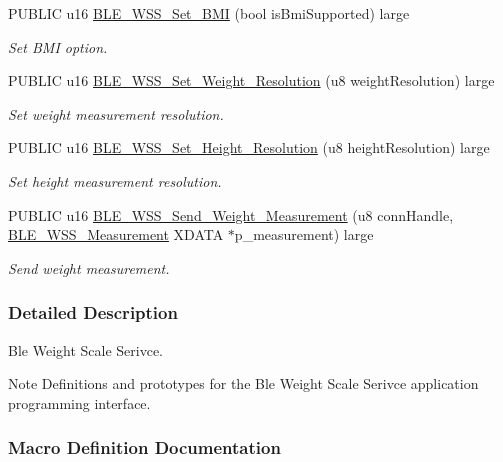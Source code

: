 \begin{DoxyCompactItemize}
P\+U\+B\+L\+IC u16 \hyperlink{group___b_l_e___w_s_s_gabc70a04b5bab2834d03c923ab7c8aaae}{B\+L\+E\+\_\+\+W\+S\+S\+\_\+\+Set\+\_\+\+B\+MI} (bool is\+Bmi\+Supported) large
\begin{DoxyCompactList}\small\item\em Set B\+MI option. \end{DoxyCompactList}\item 
P\+U\+B\+L\+IC u16 \hyperlink{group___b_l_e___w_s_s_ga89d81d43ec73d706fe9990cc163deaa2}{B\+L\+E\+\_\+\+W\+S\+S\+\_\+\+Set\+\_\+\+Weight\+\_\+\+Resolution} (u8 weight\+Resolution) large
\begin{DoxyCompactList}\small\item\em Set weight measurement resolution. \end{DoxyCompactList}\item 
P\+U\+B\+L\+IC u16 \hyperlink{group___b_l_e___w_s_s_gad5e40d9fb0c308ac600d4d169442ea0c}{B\+L\+E\+\_\+\+W\+S\+S\+\_\+\+Set\+\_\+\+Height\+\_\+\+Resolution} (u8 height\+Resolution) large
\begin{DoxyCompactList}\small\item\em Set height measurement resolution. \end{DoxyCompactList}\item 
P\+U\+B\+L\+IC u16 \hyperlink{group___b_l_e___w_s_s_gac26b437d92d46bf23b0d1b459dae9405}{B\+L\+E\+\_\+\+W\+S\+S\+\_\+\+Send\+\_\+\+Weight\+\_\+\+Measurement} (u8 conn\+Handle, \hyperlink{struct_b_l_e___w_s_s___measurement}{B\+L\+E\+\_\+\+W\+S\+S\+\_\+\+Measurement} X\+D\+A\+TA $\ast$p\+\_\+measurement) large
\begin{DoxyCompactList}\small\item\em Send weight measurement. \end{DoxyCompactList}\end{DoxyCompactItemize}


\subsubsection{Detailed Description}
Ble Weight Scale Serivce. 

\begin{DoxyNote}{Note}
Definitions and prototypes for the Ble Weight Scale Serivce application programming interface. 
\end{DoxyNote}


\subsubsection{Macro Definition Documentation}
